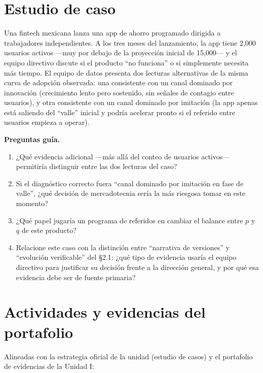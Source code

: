 \section{Estudio de caso}

\begin{casoFicticio}
Una fintech mexicana lanza una app de ahorro programado dirigida a
trabajadores independientes. A los tres meses del lanzamiento, la app tiene
2{,}000 usuarios activos —muy por debajo de la proyección inicial de 15{,}000—
y el equipo directivo discute si el producto \enquote{no funciona} o si simplemente
necesita más tiempo. El equipo de datos presenta dos lecturas alternativas de
la misma curva de adopción observada: una consistente con un canal dominado
por innovación (crecimiento lento pero sostenido, sin señales de contagio
entre usuarios), y otra consistente con un canal dominado por imitación
(la app apenas está saliendo del \enquote{valle} inicial y podría acelerar pronto si
el referido entre usuarios empieza a operar).

\textbf{Preguntas guía.}
\begin{enumerate}
  \item ¿Qué evidencia adicional —más allá del conteo de usuarios activos— permitiría distinguir entre las dos lecturas del caso?
  \item Si el diagnóstico correcto fuera \enquote{canal dominado por imitación en fase de valle}, ¿qué decisión de mercadotecnia sería la más riesgosa tomar en este momento?
  \item ¿Qué papel jugaría un programa de referidos en cambiar el balance entre $p$ y $q$ de este producto?
  \item Relacione este caso con la distinción entre \enquote{narrativa de versiones} y \enquote{evolución verificable} del \S 2.1: ¿qué tipo de evidencia usaría el equipo directivo para justificar su decisión frente a la dirección general, y por qué esa evidencia debe ser de fuente primaria?
\end{enumerate}
\end{casoFicticio}

\section{Actividades y evidencias del portafolio}

Alineadas con la estrategia oficial de la unidad (estudio de casos) y el
portafolio de evidencias de la Unidad I:

